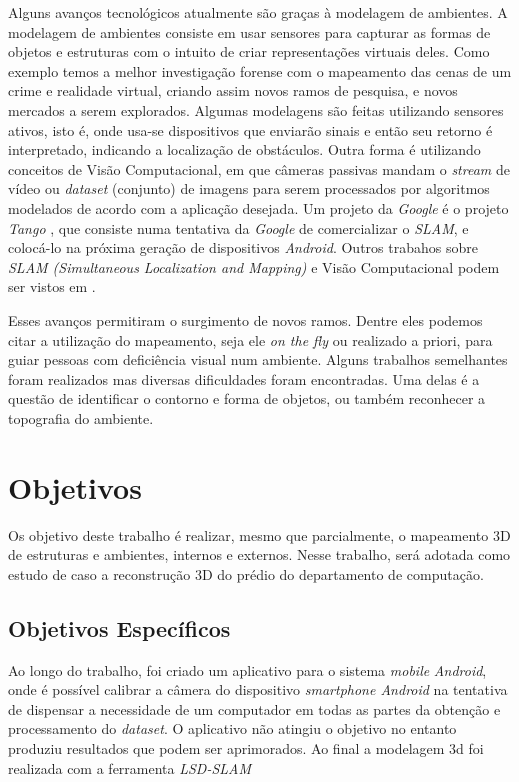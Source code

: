 Alguns avanços tecnológicos atualmente são graças à modelagem de ambientes. A modelagem de ambientes consiste em usar sensores para capturar as formas de objetos e estruturas com o intuito de criar representações virtuais deles. Como exemplo temos a melhor investigação forense com o mapeamento das cenas de um crime \cite{FIT3D} e realidade virtual, criando assim novos ramos de pesquisa, e novos mercados a serem explorados. Algumas modelagens são feitas utilizando sensores ativos, isto é, onde usa-se dispositivos que enviarão sinais e então seu retorno é interpretado, indicando a localização de obstáculos. Outra forma é utilizando conceitos de Visão Computacional, em que câmeras passivas mandam o \textit{stream} de vídeo ou \textit{dataset} (conjunto) de imagens para serem processados por algoritmos modelados de acordo com a aplicação desejada. Um projeto da \textit{Google} é o projeto \textit{Tango} \cite{Tango}, que consiste numa tentativa da \textit{Google} de comercializar o \textit{SLAM}, e colocá-lo na próxima geração de dispositivos \textit{Android}. Outros trabahos sobre \textit{SLAM (Simultaneous Localization and Mapping)} e Visão Computacional podem ser vistos em \cite{Trabalhos-Geral-SLAM}.

Esses avanços permitiram o surgimento de novos ramos. Dentre eles podemos citar a utilização do mapeamento, seja ele \textit{on the fly} ou realizado a priori, para guiar pessoas com deficiência visual num ambiente. Alguns trabalhos semelhantes foram realizados mas diversas dificuldades foram encontradas. Uma delas é a questão de identificar o contorno e forma de objetos, ou também reconhecer a topografia do ambiente. 

\section{Objetivos}

Os objetivo deste trabalho é realizar, mesmo que parcialmente, o mapeamento 3D de estruturas e ambientes, internos e externos. Nesse trabalho, será adotada como estudo de caso a reconstrução 3D do prédio do departamento de computação.

\subsection{Objetivos Específicos}

Ao longo do trabalho, foi criado um aplicativo para o sistema \textit{mobile} \textit{Android}, onde é possível calibrar a câmera do dispositivo \textit{smartphone Android} na tentativa de dispensar a necessidade de um computador em todas as partes da obtenção e processamento do \textit{dataset}. O aplicativo não atingiu o objetivo no entanto produziu resultados que podem ser aprimorados. Ao final a modelagem 3d foi realizada com a ferramenta \textit{LSD-SLAM}


